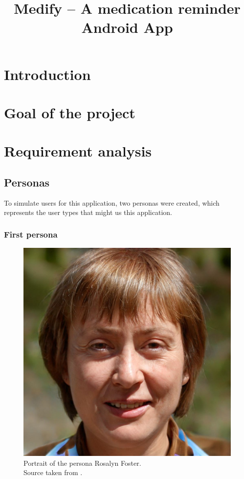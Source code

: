 \documentclass[conference]{IEEEtran}
\begin{document}
\title{Medify -- A medication reminder Android App}

\author{
}

\maketitle

\begin{abstract}
\lipsum[1][1-4] %
\end{abstract}

\section{Introduction}
\lipsum[2][1-10] %

\section{Goal of the project}
\lipsum[3][1-13] %

\section{Requirement analysis}

\subsection{Personas}
To simulate users for this application, two personas were created, which represents the user types
that might us this application.

\subsubsection{First persona} \hfill
\begin{figure}[h]
	\centerline{\includegraphics[width=.5\linewidth]{images/persona01.jpg}}
	\caption[Portrait of the persona Rosalyn Foster; Source taken from \cite{personaimg}.]
	{Portrait of the persona Rosalyn Foster.\\ Source taken from \cite{personaimg}.\endtabular}
	\label{fig:persona1}
\end{figure}
\end{document}
